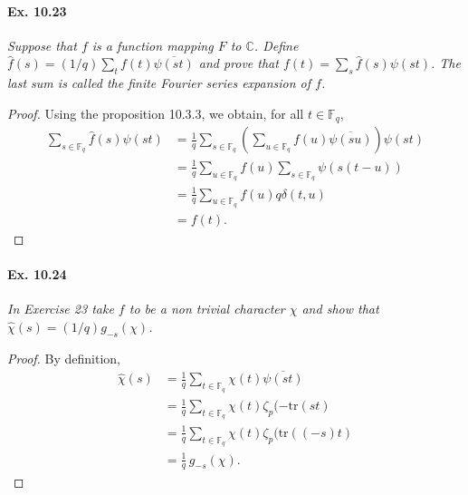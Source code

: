 \documentclass[11pt,a4paper]{article}
\newcommand{\C}{\mathbb{C}}
\newcommand{\F}{\mathbb{F}}
\begin{document}
\paragraph{Ex. 10.23} {\it Suppose that $f$ is a function mapping $F$ to $\C$. Define $\hat{f}(s) = (1/q) \sum_t f(t) \overline{\psi(st)}$ and prove that $f(t) = \sum_s \hat{f}(s) \psi(st)$. The last sum is called the finite Fourier series expansion of $f$.
}
\begin{proof} Using the proposition 10.3.3, we obtain, for all $t \in \F_q$,
\begin{align*}
 \sum_{s \in \F_q} \hat{f}(s) \psi(st) &=  \frac{1}{q} \sum_{s \in \F_q} \left(\sum_{u \in \F_q} f(u) \overline{\psi(su)} \right ) \psi(st)\\
 &= \frac{1}{q}  \sum_{u \in \F_q} f(u)  \sum_{s \in \F_q} \psi(s(t-u))\\
 &= \frac{1}{q}  \sum_{u \in \F_q} f(u)  q \delta(t,u)\\
 &= f(t).
\end{align*}

\end{proof}

\paragraph{Ex. 10.24} {\it In Exercise 23 take $f$ to be a non trivial character $\chi$ and show that $\hat{\chi}(s) = (1/q) g_{-s}(\chi)$.
}
\begin{proof} By definition,
\begin{align*}
\hat{\chi}(s) &= \frac{1}{q} \sum_{t\in \F_q} \chi(t) \overline{\psi(st)}\\
&= \frac{1}{q} \sum_{t\in \F_q} \chi(t) \zeta_p(-\mathrm{tr}(st)\\
&= \frac{1}{q} \sum_{t\in \F_q} \chi(t) \zeta_p(\mathrm{tr}((-s)t)\\
&=  \frac{1}{q} \,  g_{-s}(\chi).
\end{align*}

\end{proof}
\end{document}
